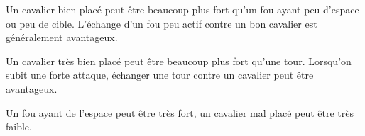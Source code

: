 Un cavalier bien placé peut être beaucoup plus fort qu'un fou ayant peu d'espace ou peu de cible. L'échange d'un fou peu actif contre un bon cavalier est généralement avantageux.

Un cavalier très bien placé peut être beaucoup plus fort qu'une tour. Lorsqu'on subit une forte attaque, échanger une tour contre un cavalier peut être avantageux.

Un fou ayant de l'espace peut être très fort, un cavalier mal placé peut être très faible.







